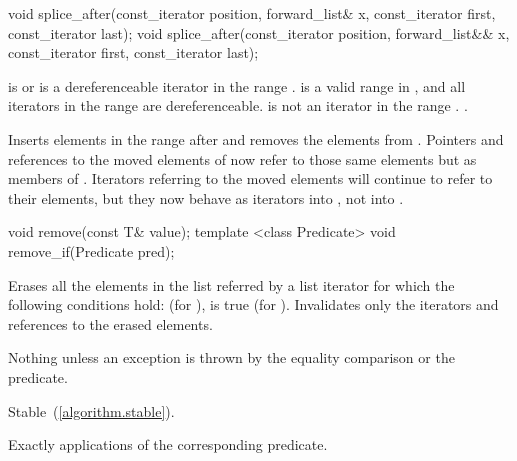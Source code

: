 %
%
\begin{itemdecl}
void splice_after(const_iterator position, forward_list& x,
                  const_iterator first, const_iterator last);
void splice_after(const_iterator position, forward_list&& x,
                  const_iterator first, const_iterator last);
\end{itemdecl}

\begin{itemdescr}
\pnum
\requires {} is  or is a
dereferenceable iterator in the range .  is a
valid range in , and all iterators in the range  are
dereferenceable.  is not an iterator in the range .
.

\pnum
\effects Inserts elements in the range  after  and
removes the elements from . Pointers and references to the moved elements of
 now refer to those same elements but as members of . Iterators
referring to the moved elements will continue to refer to their elements, but they now
behave as iterators into , not into .

\pnum
\complexity {}
\end{itemdescr}

%
%
%
%
\begin{itemdecl}
void remove(const T& value);
template <class Predicate> void remove_if(Predicate pred);
\end{itemdecl}

\begin{itemdescr}
\pnum
\effects Erases all the elements in the list referred by a list iterator  for
which the following conditions hold:  (for ),
 is true (for ).
Invalidates only the iterators and references to the erased elements.

\pnum
\throws Nothing unless an exception is thrown by the equality comparison or the
predicate.

\pnum
\remarks Stable~(\ref{algorithm.stable}).

\pnum
\complexity Exactly  applications of the corresponding
predicate.
\end{itemdescr}

